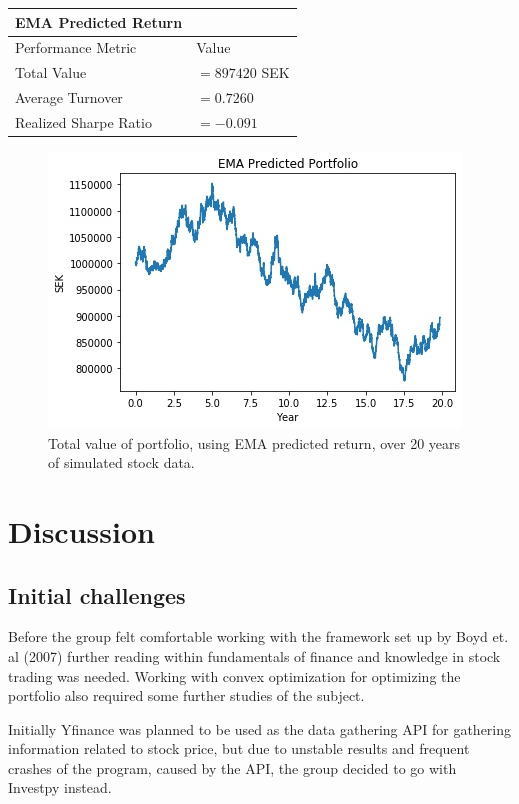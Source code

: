 \documentclass{LTHtwocol} %
\begin{document}
\begin{center}
 \begin{tabular}{||l l||} 
 \hline
 \textbf{EMA Predicted Return} & \\ [0.5ex] 
 \hline
 Performance Metric & Value\\ [0.5ex] 
 \hline\hline
 Total Value & $=897420$ SEK \\ 
 \hline
 Average Turnover& $=0.7260$ \\
 \hline
 Realized Sharpe Ratio & $=-0.091$ \\  [1ex] 
 \hline
\end{tabular}
\end{center}
\begin{figure}[h]
	\centering
	\includegraphics[width=0.8\columnwidth]{Pics/GraphtotValues_EMA.jpg}
	\caption{Total value of portfolio, using EMA predicted return, over 20 years of simulated stock data.}
	\label{fig:GraphtotValues_EMA} 
\end{figure}



\section{Discussion}
\subsection{Initial challenges}
Before the group felt comfortable working with the framework set up by Boyd et. al (2007) further reading within fundamentals of finance and knowledge in stock trading was needed. Working with convex optimization for optimizing the portfolio also required some further studies of the subject. 

Initially Yfinance was planned to be used as the data gathering API for gathering information related to stock price, but due to unstable results and frequent crashes of the program, caused by the API, the group decided to go with Investpy instead.
\end{document}
